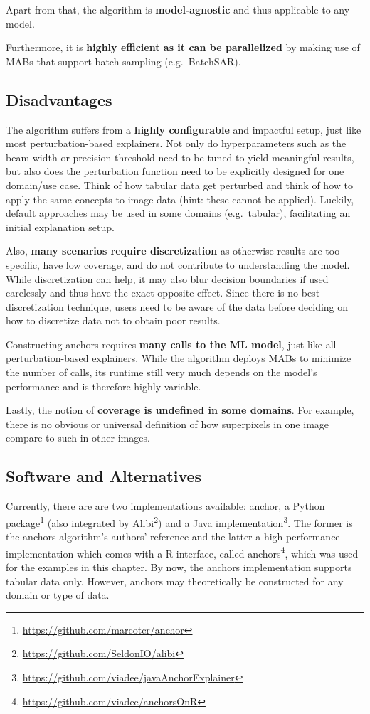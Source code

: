 \documentclass[
  11pt,
]{scrbook}
\renewcommand{\href}[2]{#2\footnote{\url{#1}}}
\begin{document}
Apart from that, the algorithm is \textbf{model-agnostic} and thus applicable to any model.

Furthermore, it is \textbf{highly efficient as it can be parallelized} by making use of MABs that support batch sampling (e.g.~BatchSAR).

\hypertarget{disadvantages-15}{%
\subsection{Disadvantages}\label{disadvantages-15}}

The algorithm suffers from a \textbf{highly configurable} and impactful setup, just like most perturbation-based explainers.
Not only do hyperparameters such as the beam width or precision threshold need to be tuned to yield meaningful results, but also does the perturbation function need to be explicitly designed for one domain/use case.
Think of how tabular data get perturbed and think of how to apply the same concepts to image data (hint: these cannot be applied).
Luckily, default approaches may be used in some domains (e.g.~tabular), facilitating an initial explanation setup.

Also, \textbf{many scenarios require discretization} as otherwise results are too specific, have low coverage, and do not contribute to understanding the model. While discretization can help, it may also blur decision boundaries if used carelessly and thus have the exact opposite effect. Since there is no best discretization technique, users need to be aware of the data before deciding on how to discretize data not to obtain poor results.

Constructing anchors requires \textbf{many calls to the ML model}, just like all perturbation-based explainers. While the algorithm deploys MABs to minimize the number of calls, its runtime still very much depends on the model's performance and is therefore highly variable.

Lastly, the notion of \textbf{coverage is undefined in some domains}. For example, there is no obvious or universal definition of how superpixels in one image compare to such in other images.

\hypertarget{software-and-alternatives-3}{%
\subsection{Software and Alternatives}\label{software-and-alternatives-3}}

Currently, there are are two implementations available: \href{https://github.com/marcotcr/anchor}{anchor, a Python package} (also integrated by \href{https://github.com/SeldonIO/alibi}{Alibi}) and a \href{https://github.com/viadee/javaAnchorExplainer}{Java implementation}.
The former is the anchors algorithm's authors' reference and the latter a high-performance implementation which comes with a R interface, called \href{https://github.com/viadee/anchorsOnR}{anchors}, which was used for the examples in this chapter.
By now, the anchors implementation supports tabular data only.
However, anchors may theoretically be constructed for any domain or type of data.
\end{document}
